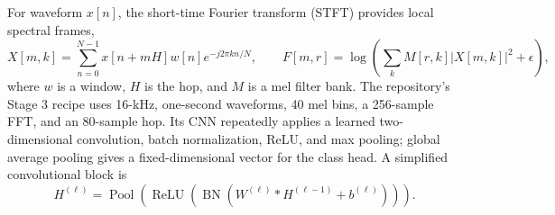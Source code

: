 \begin{table}[H]
  \caption{Architecture families and their role in this speech pipeline.}
  \centering
  \small
  \label{tab:architecture-families}
\end{table}

For waveform $x[n]$, the short-time Fourier transform (STFT) provides local spectral frames,
\begin{equation}
  X[m,k]=\sum_{n=0}^{N-1}x[n+mH]w[n]e^{-j2\pi kn/N},\qquad
  F[m,r]=\log\!\left(\sum_k M[r,k]|X[m,k]|^2+\epsilon\right),
  \label{eq:logmel}
\end{equation}
where $w$ is a window, $H$ is the hop, and $M$ is a mel filter bank. The repository's Stage 3 recipe uses 16-kHz, one-second waveforms, 40 mel bins, a 256-sample FFT, and an 80-sample hop. Its CNN repeatedly applies a learned two-dimensional convolution, batch normalization, ReLU, and max pooling; global average pooling gives a fixed-dimensional vector for the class head. A simplified convolutional block is
\begin{equation}
  H^{(\ell)}=\operatorname{Pool}\!\left(\operatorname{ReLU}\left(\operatorname{BN}\left(W^{(\ell)}*H^{(\ell-1)}+b^{(\ell)}\right)\right)\right).
  \label{eq:cnn-block}
\end{equation}

